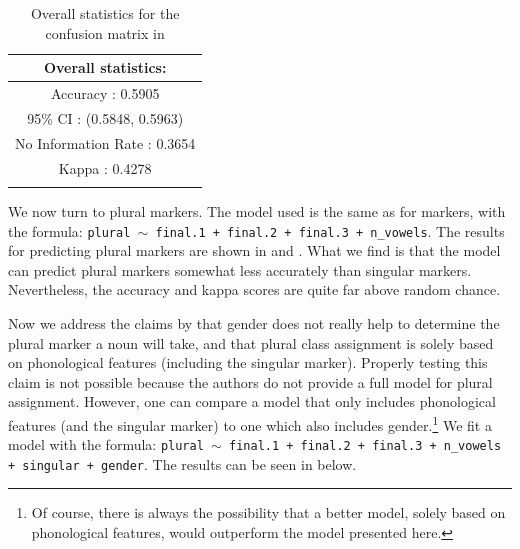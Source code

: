 \begin{table}[p]
  \centering
  \begin{tabular}{c}
    \lsptoprule
    Overall statistics: \\
    \midrule
    Accuracy : 0.5905\\
    95\% CI : (0.5848, 0.5963)\\
    No Information Rate : 0.3654\\
    Kappa : 0.4278\\
    \lspbottomrule
  \end{tabular}
  \caption{Overall statistics for the confusion matrix in }\label{tab:plural-romanian-stats}
\end{table}

We now turn to plural markers. The model used is the same as for  markers, with the formula: \texttt{plural $\sim$ final.1 + final.2 + final.3 + n\_vowels}. The results for predicting plural markers are shown in  and . What we find is that the model can predict plural markers somewhat less accurately than singular markers. Nevertheless, the accuracy and kappa scores are quite far above random chance.



Now we address the claims by \textcite{Bateman.2010} that gender does not really help to determine the plural marker a noun will take, and that plural class assignment is solely based on phonological features (including the singular marker). Properly testing this claim is not possible because the authors do not provide a full model for plural assignment. However, one can compare a model that only includes phonological features (and the singular marker) to one which also includes gender.\footnote{Of course, there is always the possibility that a better model, solely based on phonological features, would outperform the model presented here.} We fit a model with the formula: \texttt{plural $\sim$ final.1 + final.2 + final.3 + n\_vowels + singular + gender}. The results can be seen in  below.

